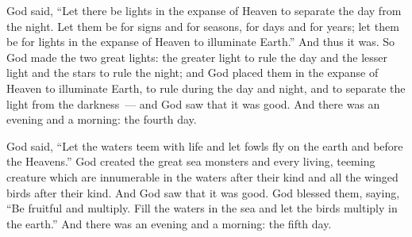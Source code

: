 \begin{inparaenum}
   God said, ``Let there be lights in the expanse of Heaven to separate the day from the night. Let them be for signs and for seasons, for days and for years;%
   let them be for lights in the expanse of Heaven to illuminate Earth.'' And thus it was.%
   So God made the two great lights: the greater light to rule the day and the lesser light and the stars to rule the night;%
   and God placed them in the expanse of Heaven to illuminate Earth,%
   to rule during the day and night, and to separate the light from the darkness~--- and God saw that it was good.%
   And there was an evening and a morning: the fourth day.%
  
   God said, ``Let the waters teem with life and let fowls fly on the earth and before the Heavens.''%
   God created the great sea monsters and every living, teeming creature which are innumerable in the waters after their kind and all the winged birds after their kind. And God saw that it was good.%
   God blessed them, saying, ``Be fruitful and multiply. Fill the waters in the sea and let the birds multiply in the earth.''%
   And there was an evening and a morning: the fifth day.%
  

\end{inparaenum}
